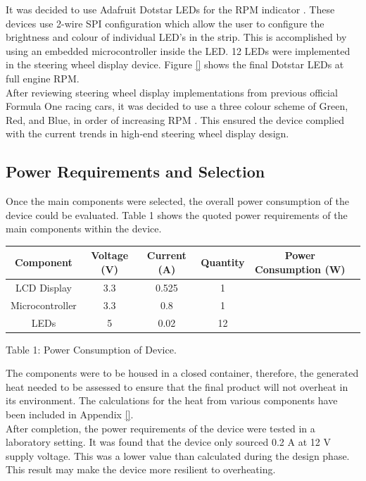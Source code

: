 \documentclass[a4paper,12pt]{article}
\begin{document}
It was decided to use Adafruit Dotstar LEDs for the RPM indicator \cite{dotstar_datasheet}. These devices use 2-wire SPI configuration which allow the user to configure the brightness and colour of individual LED’s in the strip. This is accomplished by using an embedded microcontroller inside the LED. 12 LEDs were implemented in the steering wheel display device. Figure \ref{} shows the final Dotstar LEDs at full engine RPM. \\

After reviewing steering wheel display implementations from previous official Formula One racing cars, it was decided to use a three colour scheme of Green, Red, and Blue, in order of increasing RPM \cite{bsim_racing, daily_mail_1}. This ensured the device complied with the current trends in high-end steering wheel display design.

\subsection{Power Requirements and Selection}
\label{sec:PSU}

Once the main components were selected, the overall power consumption of the device could be evaluated. Table 1 shows the quoted power requirements of the main components within the device.

\begin{center}
\begin{tabular}{ | c | c | c | c | c | c | }
\hline
 Component & Voltage (V) & Current (A) & Quantity & Power Consumption (W) \\
\hline
 LCD Display & 3.3 & 0.525 & 1 & \\
\hline
 Microcontroller & 3.3 & 0.8 & 1 & \\
\hline
 LEDs & 5 & 0.02 & 12 & \\
\hline
\end{tabular}
\par
\bigskip
Table 1: Power Consumption of Device.
\end{center}

The components were to be housed in a closed container, therefore, the generated heat needed to be assessed to ensure that the final product will not overheat in its environment. The calculations for the heat from various components have been included in Appendix \ref{}. \\

After completion, the power requirements of the device were tested in a laboratory setting. It was found that the device only sourced 0.2 A at 12 V supply voltage. This was a lower value than calculated during the design phase. This result may make the device more resilient to overheating.
\end{document}

